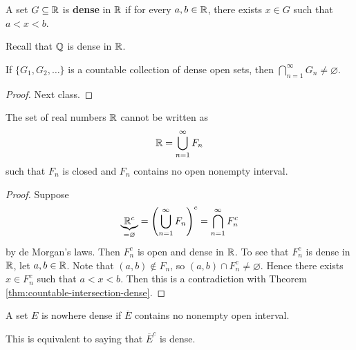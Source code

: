 \begin{definition}
  A set $G \subseteq \mathbb{R}$ is \textbf{dense} in $\mathbb{R}$ if for every
  $a, b \in \mathbb{R}$, there exists $x \in G$ such that $a < x < b$.
\end{definition}

\begin{remark}
  Recall that $\mathbb{Q}$ is dense in $\mathbb{R}$.
\end{remark}

\begin{theorem}
  \label{thm:countable-intersection-dense}
  If $\{G_1, G_2, \dots\}$ is a countable collection of dense
  open sets, then
  $\bigcap_{n = 1}^\infty G_n \ne \varnothing$.
\end{theorem}

\begin{proof}
  Next class.
\end{proof}

\begin{corollary}
  The set of real numbers $\mathbb{R}$ cannot be written as
  \[\mathbb{R} = \bigcup_{n = 1}^\infty F_n\]
  such that $F_n$ is closed and $F_n$ contains no open nonempty
  interval.
\end{corollary}

\begin{proof}
  Suppose
  \[\underbrace{\mathbb{R}^c}_{= \varnothing} = \left(\bigcup_{n = 1}^\infty F_n\right)^c = \bigcap_{n = 1}^\infty F_n^c\]
  by de Morgan's laws. Then $F_n^c$ is open and dense in $\mathbb{R}$. To
  see
  that $F_n^c$ is dense in $\mathbb{R}$, let $a, b \in \mathbb{R}$. Note that
  $(a, b) \notin F_n$, so $(a, b) \cap F_n^c \ne \varnothing$.
  Hence there exists $x \in F_n^c$ such that $a < x < b$. Then
  this is a contradiction with Theorem
  \ref{thm:countable-intersection-dense}.
\end{proof}

\begin{definition}
  A set $E$ is nowhere dense if $\overline{E}$ contains no
  nonempty open interval.
\end{definition}

\begin{remark}
  This is equivalent to saying that $\overline{E}^c$ is dense.
\end{remark}
